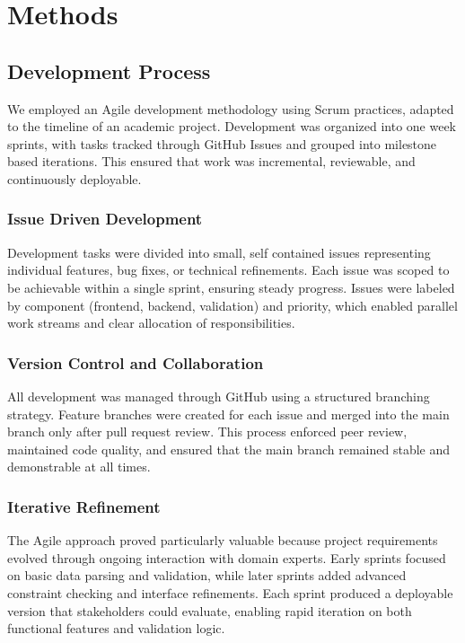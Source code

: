 \section{Methods}

\subsection{Development Process}

We employed an Agile development methodology using Scrum practices, adapted to the timeline of an academic project. Development was organized into one week sprints, with tasks tracked through GitHub Issues and grouped into milestone based iterations. This ensured that work was incremental, reviewable, and continuously deployable.

\subsubsection{Issue Driven Development}

Development tasks were divided into small, self contained issues representing individual features, bug fixes, or technical refinements. Each issue was scoped to be achievable within a single sprint, ensuring steady progress. Issues were labeled by component (frontend, backend, validation) and priority, which enabled parallel work streams and clear allocation of responsibilities.

\subsubsection{Version Control and Collaboration}

All development was managed through GitHub using a structured branching strategy. Feature branches were created for each issue and merged into the main branch only after pull request review. This process enforced peer review, maintained code quality, and ensured that the main branch remained stable and demonstrable at all times.

\subsubsection{Iterative Refinement}

The Agile approach proved particularly valuable because project requirements evolved through ongoing interaction with domain experts. Early sprints focused on basic data parsing and validation, while later sprints added advanced constraint checking and interface refinements. Each sprint produced a deployable version that stakeholders could evaluate, enabling rapid iteration on both functional features and validation logic.


